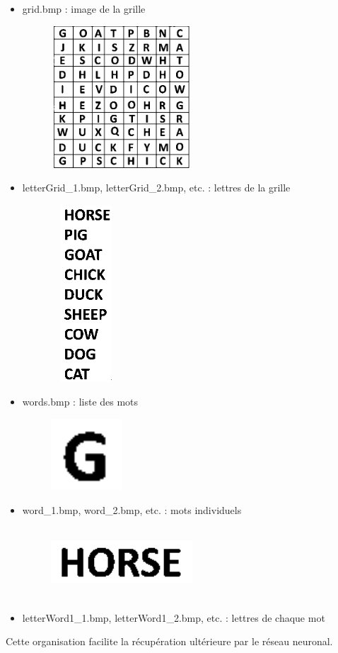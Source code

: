 
\begin{itemize}
  \item grid.bmp : image de la grille
\begin{figure}[hbt]
	\centering
	\includegraphics[width=200px,height=200px]{obrazky-figures/7.png}
\end{figure}
\newpage
  \item letterGrid\_1.bmp, letterGrid\_2.bmp, etc. : lettres de la grille
\begin{figure}[hbt]
	\centering
	\includegraphics[width=100px,height=250px]{obrazky-figures/8.png}
\end{figure}
  \item words.bmp : liste des mots
\begin{figure}[hbt]
	\centering
	\includegraphics[width=100px,height=100px]{obrazky-figures/9.png}
\end{figure}
  \item word\_1.bmp, word\_2.bmp, etc. : mots individuels
\begin{figure}[hbt]
	\centering
	\includegraphics[width=200px,height=100px]{obrazky-figures/10.png}
\end{figure}
  \item letterWord1\_1.bmp, letterWord1\_2.bmp, etc. : lettres de chaque mot
\end{itemize}

Cette organisation facilite la récupération ultérieure par le réseau neuronal.